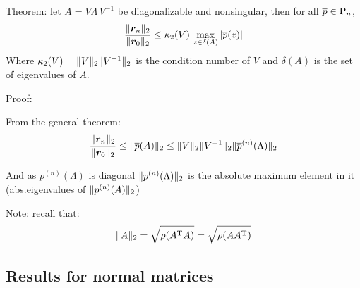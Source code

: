 \documentclass[
  12pt,
  paper=a4,
]{scrartcl} %
\begin{document}
Theorem: let $A = V \Lambda\, V^{-1}$ be diagonalizable and nonsingular, then for all $\overline p\in \mathrm{P}_n$,
\[
\frac{\|\bm r_n\|_2}{\|\bm r_0\|_2} \le
    \kappa_2(V)\,
    \max_{z\in\delta(A)}
    |\overline{p}(z)|
\]
Where $\kappa_2(V)=\|V\|_2\|V^{-1}\|_2$ is the condition number of $V$ and $\delta(A)$ is the set of eigenvalues of $A$.

Proof:

From the general theorem:
\[
\frac{\|\bm r_n\|_2}{\|\bm r_0\|_2} \le
    \|\overline p(A)\|_2 \le
    \|V\|_2\|V^{-1}\|_2
    \|\overline p^{(n)}(\Lambda)\|_2
\]

And as ${p^{(n)}(\Lambda)}$ is diagonal $\|p^{(n)}(\Lambda)\|_2$ is the absolute maximum element in it (abs.\@ eigenvalues of $\|p^{(n)} (A)\|_2$)

Note: recall that:
\[
    \|A\|_2 = \sqrt{\rho(A^{\mathrm{T}} A)} = \sqrt{\rho(A A^{\mathrm{T}})}
\]


\subsection*{Results for normal matrices}
\end{document}
